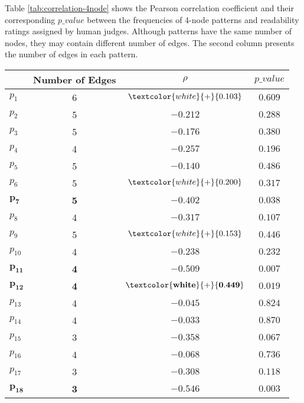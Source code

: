 Table \ref{tab:correlation-4node} shows the Pearson correlation coefficient and their corresponding $p\_value$ between the frequencies of 4-node patterns and readability ratings assigned by human judges. 
Although patterns have the same number of nodes, they may contain different number of edges. 
The second column presents the number of edges in each pattern. 

\begin{table}[!ht]
	\begin{center}
		\begin{tabular}{lccc}
			\hline
   								& Number of Edges & $\rho$ 						 	& $p\_value$				\\
   			\hline
			$p_1$ 				& 6 			  & $\textcolor{white}{+}{0.103}$ 	& $0.609$					\\
			$p_2$ 				& 5 			  & $-0.212$ 					 	& $0.288$					\\
			$p_3$  				& 5				  & $-0.176$				     	& $0.380$					\\
			$p_4$  				& 4 			  & $-0.257$ 				     	& $0.196$					\\
			$p_5$ 				& 5 			  & $-0.140$ 					 	& $0.486$					\\
			$p_6$  				& 5 			  & $\textcolor{white}{+}{0.200}$  	& $0.317$					\\
			$\mathbf{p_7}$ 	& \textbf{5} 	  & $\mathbf{-0.402}$ 			 	& $\mathbf{0.038}$			\\
			$p_8$  				& 4 			  & $-0.317$ 					 	& $0.107$					\\
			$p_9$ 				& 5 			  & $\textcolor{white}{+}{0.153}$  	& $0.446$					\\
			$p_{10}$ 			& 4 			  & $-0.238$ 					 	& $0.232$					\\
			$\mathbf{p_{11}}$ 	& \textbf{4} 	  & $\mathbf{-0.509}$            	& $\mathbf{0.007}$			\\
			$\mathbf{p_{12}}$  	& \textbf{4} 	  & $\mathbf{\textcolor{white}{+}{0.449}}$ & $\mathbf{0.019}$	\\
			$p_{13}$			& 4 			  & $-0.045$ 						& $0.824$					\\
			$p_{14}$			& 4 			  & $-0.033$ 						& $0.870$					\\
			$p_{15}$			& 3				  & $-0.358$ 						& $0.067$					\\
			$p_{16}$ 			& 4 			  & $-0.068$ 						& $0.736$					\\
			$p_{17}$			& 3 			  & $-0.308$ 						& $0.118$					\\
			$\mathbf{p_{18}}$	& \textbf{3}	  & $\mathbf{-0.546}$				& $\mathbf{0.003}$			\\

\end{tabular}
\end{center}
\end{table}
